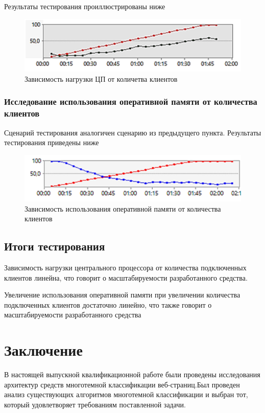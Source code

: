 \documentclass[russian, utf8, emptystyle]{eskdtext}
\begin{document}
Результаты тестирования проиллюстрированы ниже
 \begin{figure}[h]
 	\begin{center}
 		\includegraphics[width=12cm]{pic/test1.png}
 		\caption{Зависимость нагрузки ЦП от количетва клиентов}
 		\label{fig:low_sigma}
 	\end{center}
 \end{figure}
 
\subsubsection{Исследование использования оперативной памяти от количества клиентов}

Сценарий тестирования аналогичен сценарию из предыдущего пункта.
Результаты тестирования приведены ниже
\begin{figure}[h]
	\begin{center}
		\includegraphics[width=12cm]{pic/test2.png}
		\caption{Зависимость использования оперативной памяти от количества клиентов}
		\label{fig:low_sigma}
	\end{center}
\end{figure}
\subsection{Итоги тестирования}

Зависимость нагрузки центрального процессора от количества подключенных клиентов линейна, что говорит о масштабируемости разработанного средства.

Увеличение использования оперативной памяти при увеличении количества подключенных клиентов достаточно линейно, что также говорит о масштабируемости разработанного средства
\section {Заключение}
В настоящей выпускной квалификационной работе были проведены исследования архитектур средств многотемной классификации веб-страниц.Был проведен анализ существующих алгоритмов многотемной классификации и выбран тот, который удовлетворяет требованиям поставленной задачи.
\end{document}
